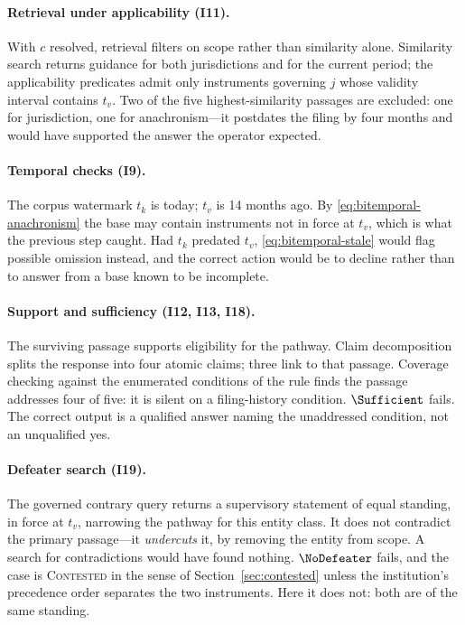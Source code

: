 \paragraph{Retrieval under applicability (I11).} With $c$ resolved, retrieval filters on
scope rather than similarity alone. Similarity search returns guidance for both
jurisdictions and for the current period; the applicability predicates admit only
instruments governing $j$ whose validity interval contains $t_v$. Two of the five
highest-similarity passages are excluded: one for jurisdiction, one for
anachronism---it postdates the filing by four months and would have supported the
answer the operator expected.

\paragraph{Temporal checks (I9).} The corpus watermark $t_k$ is today; $t_v$ is 14 months
ago. By \eqref{eq:bitemporal-anachronism} the base may contain instruments not in force
at $t_v$, which is what the previous step caught. Had $t_k$ predated $t_v$,
\eqref{eq:bitemporal-stale} would flag possible omission instead, and the correct action
would be to decline rather than to answer from a base known to be incomplete.

\paragraph{Support and sufficiency (I12, I13, I18).} The surviving passage supports
eligibility for the pathway. Claim decomposition splits the response into four atomic
claims; three link to that passage. Coverage checking against the enumerated conditions
of the rule finds the passage addresses four of five: it is silent on a filing-history
condition. $\Sufficient$ fails. The correct output is a qualified answer naming the
unaddressed condition, not an unqualified yes.

\paragraph{Defeater search (I19).} The governed contrary query returns a supervisory
statement of equal standing, in force at $t_v$, narrowing the pathway for this entity
class. It does not contradict the primary passage---it \emph{undercuts} it, by removing
the entity from scope. A search for contradictions would have found nothing.
$\NoDefeater$ fails, and the case is \textsc{Contested} in the sense of
Section~\ref{sec:contested} unless the institution's precedence order separates the two
instruments. Here it does not: both are of the same standing.

